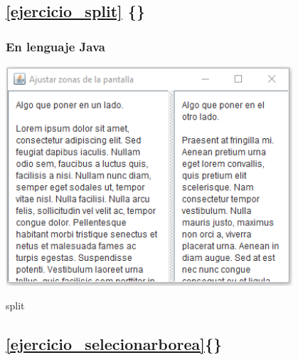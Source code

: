 \documentclass[spanish,12pt,a4paper,final,oneside]{book}
\begin{document}
\vspace{2cm}
\subsection*{\ref{ejercicio_split} \{\}}
\vspace{0.5cm}
\subsubsection*{En lenguaje Java} \lstset{language=Java} 
\includegraphics[width=0.8\textwidth]{Split - pantallazo - Java}


split

\vspace{2cm}
\subsection*{\ref{ejercicio_selecionarborea}\{\}}
\vspace{0.5cm}
\end{document}
